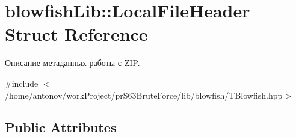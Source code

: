 \hypertarget{structblowfish_lib_1_1_local_file_header}{}\section{blowfish\+Lib\+:\+:Local\+File\+Header Struct Reference}
\label{structblowfish_lib_1_1_local_file_header}


Описание метаданных работы с Z\+IP.  




{\ttfamily \#include $<$/home/antonov/work\+Project/pr\+S63\+Brute\+Force/lib/blowfish/\+T\+Blowfish.\+hpp$>$}

\subsection*{Public Attributes}
